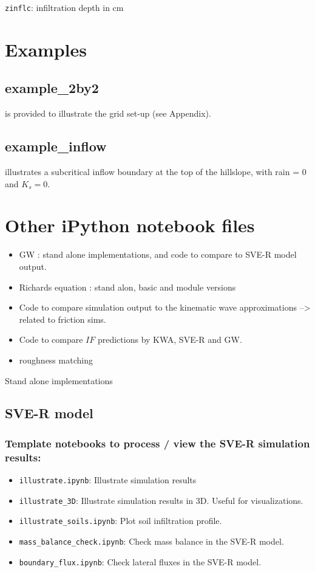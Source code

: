 \documentclass{article}
\newcommand{\code}[1]{\texttt{#1}}
\begin{document}
 \code{zinflc}: infiltration depth in cm






\section{Examples}
\subsection{example\_2by2} is provided to illustrate the grid set-up (see Appendix).
\subsection{example\_inflow} illustrates a subcritical inflow boundary at the top of the hillslope, with rain = 0 and $K_s=0$.

	
\section{Other iPython notebook files}	

\begin{itemize}
	\item GW :  stand alone implementations, and code to compare to SVE-R model output.
	\item  Richards equation : stand alon, basic and module versions
	\item  Code to compare simulation output to the kinematic wave approximations --> related to friction sims.
	\item Code to compare $IF$ predictions by KWA, SVE-R and GW.
	\item roughness matching
\end{itemize}

Stand alone implementations


\subsection{SVE-R model}
\subsubsection*{Template notebooks to process / view the SVE-R simulation results:}
\begin{itemize}
	\item \code{illustrate.ipynb}: Illustrate simulation results
	\item \code{illustrate\_3D}:  Illustrate simulation results in 3D.  Useful for visualizations.
	\item \code{illustrate\_soils.ipynb}: Plot soil infiltration profile. 
	\item \code{mass\_balance\_check.ipynb}: Check mass balance in the SVE-R model. 
	\item \code{boundary\_flux.ipynb}: Check lateral fluxes in the SVE-R model. 
\end{itemize}
\end{document}
